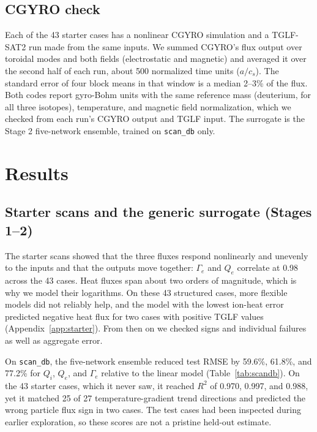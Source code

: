 \documentclass[12pt,letterpaper]{article}
\begin{document}
\subsection{CGYRO check}
\label{sec:meth-cgyro}

Each of the 43 starter cases has a nonlinear CGYRO simulation and a TGLF-SAT2 run made from
the same inputs. We summed CGYRO's flux output over toroidal modes and both fields
(electrostatic and magnetic) and averaged it over the second half of each run, about
500 normalized time units ($a/c_s$). The standard error of four block means in that window
is a median 2--3\% of the flux. Both codes report gyro-Bohm units with the same reference
mass (deuterium, for all three isotopes), temperature, and magnetic field normalization,
which we checked from each run's CGYRO output and TGLF input. The surrogate is the Stage 2
five-network ensemble, trained on \texttt{scan\_db} only.

\section{Results}
\label{sec:results}

\subsection{Starter scans and the generic surrogate (Stages 1--2)}
\label{sec:res-generic}

The starter scans showed that the three fluxes respond nonlinearly and unevenly to the
inputs and that the outputs move together: $\Gamma_e$ and $Q_e$ correlate at 0.98 across
the 43 cases. Heat fluxes span about two orders of magnitude, which is why we model their
logarithms. On these 43 structured cases, more flexible models did not reliably help, and
the model with the lowest ion-heat error predicted negative heat flux for two cases with
positive TGLF values (Appendix~\ref{app:starter}). From then on we checked signs and
individual failures as well as aggregate error.

On \texttt{scan\_db}, the five-network ensemble reduced test RMSE by 59.6\%, 61.8\%, and
77.2\% for $Q_i$, $Q_e$, and $\Gamma_e$ relative to the linear model (Table~\ref{tab:scandb}).
On the 43 starter cases, which it never saw, it reached $R^2$ of 0.970, 0.997, and 0.988, yet
it matched 25 of 27 temperature-gradient trend directions and predicted the wrong particle
flux sign in two cases. The test cases had been inspected during earlier exploration, so
these scores are not a pristine held-out estimate.
\end{document}
